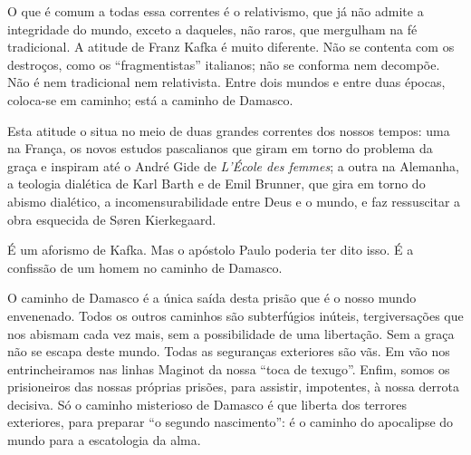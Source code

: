 O que é comum a todas
essa correntes é o relativismo, que já não admite a integridade do
mundo, exceto a daqueles, não raros, que mergulham na fé tradicional.
A atitude de Franz Kafka é muito diferente. Não se contenta com os
destroços, como os ``fragmentistas'' italianos; não se conforma nem
decompõe. Não é nem tradicional nem relativista. Entre dois mundos e
entre duas épocas, coloca-se em caminho; está a caminho de Damasco.

Esta atitude o situa no meio de duas grandes correntes dos nossos tempos: uma
na França, os novos estudos pascalianos que giram em torno do problema da
graça e inspiram até o André Gide de \textit{L'École des femmes}; a outra na
Alemanha, a teologia dialética de Karl Barth e de Emil Brunner,
que gira em torno do abismo dialético, a incomensurabilidade entre Deus
e o mundo, e faz ressuscitar a obra esquecida de Søren Kierkegaard.



\begin{quote}
\end{quote}

É um aforismo de Kafka.
Mas o apóstolo Paulo poderia ter dito isso. É a confissão de um homem no caminho de Damasco.

O caminho de Damasco é a única saída desta prisão que é o nosso mundo envenenado. Todos os outros caminhos são subterfúgios inúteis, tergiversações que nos abismam cada vez mais, sem a possibilidade de uma libertação.
Sem a graça não se escapa deste mundo. Todas as seguranças exteriores são vãs.
Em vão nos entrincheiramos nas linhas Maginot da nossa ``toca de texugo''.
Enfim, somos os prisioneiros das nossas próprias prisões, para assistir, impotentes, à
nossa derrota decisiva. Só o caminho misterioso de Damasco é que liberta dos terrores exteriores,
para preparar ``o segundo nascimento'': é o caminho do apocalipse do
mundo para a escatologia da alma.

